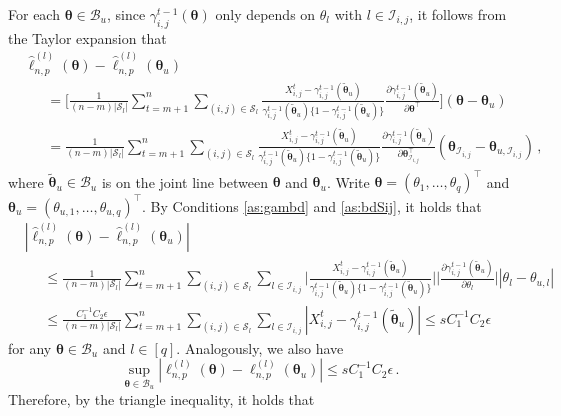 \documentclass[12pt]{article}
\newcommand{\btheta}{\boldsymbol \theta}
\def\T{{\scriptscriptstyle \top} }
\newcommand{\0}{{\bf 0}}
\begin{document}
For each $\btheta \in \mathcal{B}_u$, since $\gamma_{i,j}^{t-1}(\btheta)$ only depends on $\theta_l$ with $l\in\mathcal{I}_{i,j}$, it follows from the Taylor expansion that  
\begin{align*}
&\hat{\ell}_{n,p}^{(l)}(\btheta)-\hat{\ell}_{n,p}^{(l)}(\btheta_u)\\
&~~~~~~~=\bigg[\frac{1}{(n-m)|\mathcal{S}_l|}\sum_{t=m+1}^n\sum_{(i,j)\in\mathcal{S}_l}\frac{X_{i,j}^{t}-\gamma_{i,j}^{t-1}(\tilde{\btheta}_u)}{\gamma_{i,j}^{t-1}(\tilde{\btheta}_u)\{1-\gamma_{i,j}^{t-1}(\tilde{\btheta}_u)\}}\frac{\partial\gamma_{i,j}^{t-1}(\tilde{\btheta}_u)}{\partial\btheta^{\T}}\bigg](\btheta-\btheta_u)\\
&~~~~~~~=\frac{1}{(n-m)|\mathcal{S}_l|}\sum_{t=m+1}^n\sum_{(i,j)\in\mathcal{S}_l}\frac{X_{i,j}^{t}-\gamma_{i,j}^{t-1}(\tilde{\btheta}_u)}{\gamma_{i,j}^{t-1}(\tilde{\btheta}_u)\{1-\gamma_{i,j}^{t-1}(\tilde{\btheta}_u)\}}\frac{\partial\gamma_{i,j}^{t-1}(\tilde{\btheta}_u)}{\partial\btheta_{\mathcal{I}_{i,j}}^{\T}}(\btheta_{\mathcal{I}_{i,j}}-\btheta_{u,\mathcal{I}_{i,j}})\,,
\end{align*}
where $\tilde{\btheta}_u \in \mathcal{B}_u$ is on the joint line between $\btheta$ and $\btheta_u$. Write $\btheta=(\theta_1,\ldots,\theta_q)^{\T}$ and $\btheta_u=(\theta_{u,1},\ldots,\theta_{u,q})^{\T}$. 
By Conditions \ref{as:gambd} and \ref{as:bdSij}, it holds that 
\begin{align*}
    &|\hat{\ell}_{n,p}^{(l)}(\btheta) - \hat{\ell}_{n,p}^{(l)}(\btheta_u)|
       \\&~~~~~~ \leq \frac{1}{(n-m)|\mathcal{S}_l|}\sum_{t = m+1}^n \sum_{(i,j)\in\mathcal{S}_l}\sum_{l\in\mathcal{I}_{i,j}} \bigg| \frac{X_{i,j}^{t}- \gamma_{i,j}^{t-1}(\tilde{ \btheta}_u)}{\gamma_{i,j}^{t-1}(\tilde{\btheta}_u)\{1- \gamma_{i,j}^{t-1}(\tilde{ \btheta}_u)\} }\bigg|\bigg|\frac{\partial \gamma_{i,j}^{t-1}(\tilde{\btheta}_u)}{\partial \theta_l}\bigg| |\theta_l - \theta_{u,l}| 
       \\&~~~~~~ \leq \frac{C_1^{-1}C_2\epsilon}{(n-m)|\mathcal{S}_l|}\sum_{t = m+1}^n \sum_{(i,j)\in\mathcal{S}_l}\sum_{l\in\mathcal{I}_{i,j}}  |X_{i,j}^{t}- \gamma_{i,j}^{t-1}(\tilde{\btheta}_u)|\leq sC_1^{-1}C_2\epsilon
\end{align*}
for any $\btheta\in\mathcal{B}_u$ and $l\in[q]$. Analogously, we also have 
\[
\sup_{\btheta\in\mathcal{B}_u}|\ell_{n,p}^{(l)}(\btheta)-\ell_{n,p}^{(l)}(\btheta_u)|\leq sC_1^{-1}C_2\epsilon\,.
\]
Therefore, by the triangle inequality, it holds that
\end{document}
